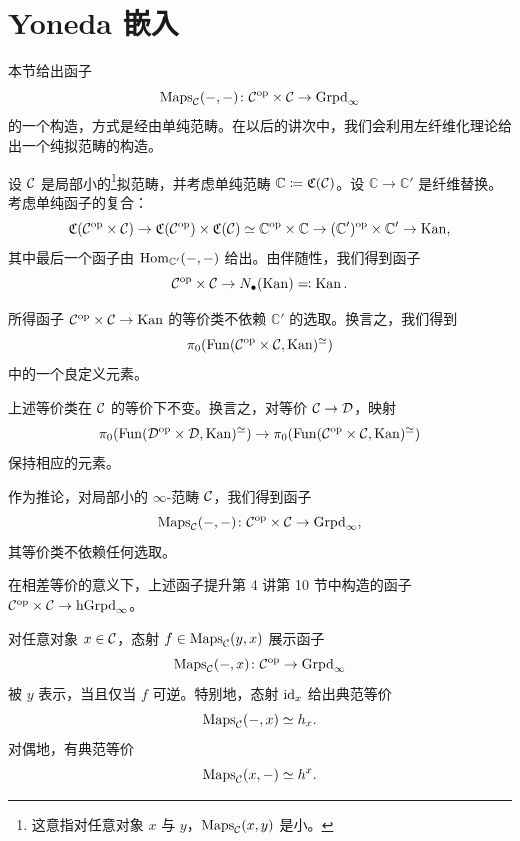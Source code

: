 \section{Yoneda 嵌入}

\nitem\label{L11-4.1} 本节给出函子
\[
\mathrm{Maps}_{\mathcal{C}}(-,-)\colon\mathcal{C}^{\mathrm{op}}\times\mathcal{C}\to\operatorname{Grpd}_\infty
\]
的一个构造，方式是经由单纯范畴。在以后的讲次中，我们会利用左纤维化理论给出一个纯拟范畴的构造。

\begin{construction}\label{L11-4.2}
设 $\mathcal{C}$ 是局部小的\footnote{这意指对任意对象 $x$ 与 $y$，$\mathrm{Maps}_{\mathcal{C}}(x,y)$ 是小。}拟范畴，并考虑单纯范畴 $\mathbb{C}\coloneqq\mathfrak{C}(\mathcal{C})$。设 $\mathbb{C}\to\mathbb{C}'$ 是纤维替换。考虑单纯函子的复合：
\[
\mathfrak{C}(\mathcal{C}^{\mathrm{op}}\times\mathcal{C})\to\mathfrak{C}(\mathcal{C}^{\mathrm{op}})\times\mathfrak{C}(\mathcal{C})\simeq\mathbb{C}^{\mathrm{op}}\times\mathbb{C}\to(\mathbb{C}')^{\mathrm{op}}\times\mathbb{C}'\to\operatorname{Kan},
\]
其中最后一个函子由 $\operatorname{Hom}_{\mathbb{C}'}(-,-)$ 给出。由伴随性，我们得到函子
\[
\mathcal{C}^{\mathrm{op}}\times\mathcal{C}\to N_{\bullet}(\operatorname{Kan})\eqqcolon\operatorname{Kan}.
\]
\end{construction}

\begin{exercise}\label{L11-4.3}
所得函子 $\mathcal{C}^{\mathrm{op}}\times\mathcal{C}\to\operatorname{Kan}$ 的等价类不依赖 $\mathbb{C}'$ 的选取。换言之，我们得到
\[
\pi_0(\operatorname{Fun}(\mathcal{C}^{\mathrm{op}}\times\mathcal{C},\operatorname{Kan})^{\simeq})
\]
中的一个良定义元素。
\end{exercise}

\begin{exercise}\label{L11-4.4}
上述等价类在 $\mathcal{C}$ 的等价下不变。换言之，对等价 $\mathcal{C}\to\mathcal{D}$，映射
\[
\pi_0(\operatorname{Fun}(\mathcal{D}^{\mathrm{op}}\times\mathcal{D},\operatorname{Kan})^{\simeq})\to\pi_0(\operatorname{Fun}(\mathcal{C}^{\mathrm{op}}\times\mathcal{C},\operatorname{Kan})^{\simeq})
\]
保持相应的元素。
\end{exercise}

\nitem\label{L11-4.5} 作为推论，对局部小的 $\infty$-范畴 $\mathcal{C}$，我们得到函子
\[
\mathrm{Maps}_{\mathcal{C}}(-,-)\colon\mathcal{C}^{\mathrm{op}}\times\mathcal{C}\to\operatorname{Grpd}_\infty,
\]
其等价类不依赖任何选取。

\begin{exercise}\label{L11-4.6}
在相差等价的意义下，上述函子提升第 4 讲第 10 节中构造的函子 $\mathcal{C}^{\mathrm{op}}\times\mathcal{C}\to\operatorname{hGrpd}_\infty$。
\end{exercise}

\begin{exercise}\label{L11-4.7}
对任意对象 $x\in\mathcal{C}$，态射 $f\in\mathrm{Maps}_{\mathcal{C}}(y,x)$ 展示函子
\[
\mathrm{Maps}_{\mathcal{C}}(-,x)\colon\mathcal{C}^{\mathrm{op}}\to\operatorname{Grpd}_\infty
\]
被 $y$ 表示，当且仅当 $f$ 可逆。特别地，态射 $\operatorname{id}_x$ 给出典范等价
\[
\mathrm{Maps}_{\mathcal{C}}(-,x)\simeq h_x.
\]
对偶地，有典范等价
\[
\mathrm{Maps}_{\mathcal{C}}(x,-)\simeq h^x.
\]
\end{exercise}

